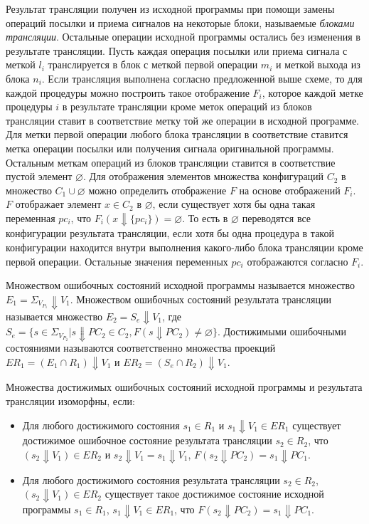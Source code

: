 Результат трансляции получен из исходной программы при помощи замены операций посылки и приема сигналов на некоторые блоки, называемые \textit{блоками трансляции}.
Остальные операции исходной программы остались без изменения в результате трансляции.
Пусть каждая операция посылки или приема сигнала с меткой $l_i$ транслируется в блок с меткой первой операции $m_i$ и меткой выхода из блока $n_i$.
Если трансляция выполнена согласно предложенной выше схеме, то для каждой процедуры можно построить такое отображение $F_i$, которое каждой метке процедуры $i$ в результате трансляции кроме меток операций из блоков трансляции ставит в соответствие метку той же операции в исходной программе.
Для метки первой операции любого блока трансляции в соответствие ставится метка операции посылки или получения сигнала оригинальной программы.
Остальным меткам операций из блоков трансляции ставится в соответствие пустой элемент $\varnothing$.
Для отображения элементов множества конфигураций $C_2$ в множество $C_1 \cup {\varnothing}$ можно определить отображение $F$ на основе отображений $F_i$.
$F$ отображает элемент $x \in C_2$ в $\varnothing$, если существует хотя бы одна такая переменная $pc_i$, что $F_i(x \Downarrow \{pc_i\}) = \varnothing$.
То есть в $\varnothing$ переводятся все конфигурации результата трансляции, если хотя бы одна процедура в такой конфигурации находится внутри выполнения какого-либо блока трансляции кроме первой операции.
Остальные значения переменных $pc_i$ отображаются согласно $F_i$.

Множеством ошибочных состояний исходной программы называется множество $E_1 = \Sigma_{V_{P_1}} \Downarrow V_1$.
Множеством ошибочных состояний результата трансляции называется множество $E_2 = S_e \Downarrow V_1$, где $S_e = \{s \in \Sigma_{V_{P_2}}| s \Downarrow {PC_2} \in C_2, F(s \Downarrow {PC_2}) \neq \varnothing\}$.
Достижимыми ошибочными состояниями называются соответственно множества проекций $ER_1 = (E_1 \cap R_1) \Downarrow V_1$ и $ER_2 = (S_e \cap R_2) \Downarrow V_1$.

Множества достижимых ошибочных состояний исходной программы и результата трансляции изоморфны, если:
\begin{itemize}
    \item Для любого достижимого состояния $s_1 \in R_1$ и $s_1 \Downarrow V_1 \in ER_1$ существует достижимое ошибочное состояние результата трансляции $s_2 \in R_2$, что $(s_2 \Downarrow V_1) \in ER_2$ и $s_2 \Downarrow V_1 = s_1 \Downarrow V_1$, $F(s_2 \Downarrow PC_2) = s_1 \Downarrow PC_1$.
    \item Для любого достижимого состояния результата трансляции $s_2 \in R_2$, $(s_2 \Downarrow V_1) \in ER_2$ существует такое достижимое состояние исходной программы $s_1 \in R_1$, $s_1 \Downarrow V_1 \in ER_1$, что $F(s_2 \Downarrow PC_2) = s_1 \Downarrow PC_1$.
\end{itemize}

